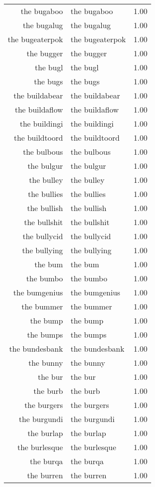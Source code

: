 \begin{table}[ht]
\begin{tabular}{rlr}
  the bugaboo & the bugaboo & 1.00 \\ 
  the bugalug & the bugalug & 1.00 \\ 
  the bugeaterpok & the bugeaterpok & 1.00 \\ 
  the bugger & the bugger & 1.00 \\ 
  the bugl & the bugl & 1.00 \\ 
  the bugs & the bugs & 1.00 \\ 
  the buildabear & the buildabear & 1.00 \\ 
  the buildaflow & the buildaflow & 1.00 \\ 
  the buildingi & the buildingi & 1.00 \\ 
  the buildtoord & the buildtoord & 1.00 \\ 
  the bulbous & the bulbous & 1.00 \\ 
  the bulgur & the bulgur & 1.00 \\ 
  the bulley & the bulley & 1.00 \\ 
  the bullies & the bullies & 1.00 \\ 
  the bullish & the bullish & 1.00 \\ 
  the bullshit & the bullshit & 1.00 \\ 
  the bullycid & the bullycid & 1.00 \\ 
  the bullying & the bullying & 1.00 \\ 
  the bum & the bum & 1.00 \\ 
  the bumbo & the bumbo & 1.00 \\ 
  the bumgenius & the bumgenius & 1.00 \\ 
  the bummer & the bummer & 1.00 \\ 
  the bump & the bump & 1.00 \\ 
  the bumps & the bumps & 1.00 \\ 
  the bundesbank & the bundesbank & 1.00 \\ 
  the bunny & the bunny & 1.00 \\ 
  the bur & the bur & 1.00 \\ 
  the burb & the burb & 1.00 \\ 
  the burgers & the burgers & 1.00 \\ 
  the burgundi & the burgundi & 1.00 \\ 
  the burlap & the burlap & 1.00 \\ 
  the burlesque & the burlesque & 1.00 \\ 
  the burqa & the burqa & 1.00 \\ 
  the burren & the burren & 1.00 \\ 

\end{tabular}
\end{table}
